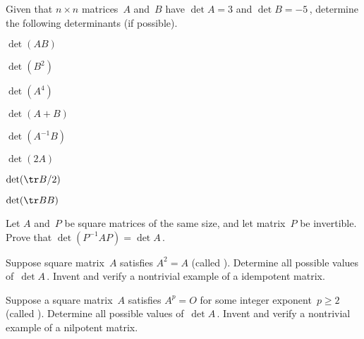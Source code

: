 \begin{exercise} \label{ex:} 
Given that \(n\times n\) matrices~\(A\) and~\(B\) have \(\det A=3\) and \(\det B=-5\)\,, determine the following determinants (if possible).
\begin{parts}
\item \(\det(AB)\)

\item \(\det(B^2)\)

\item \(\det(A^4)\)

\item \(\det(A+B)\)

\item \(\det(A^{-1}B)\)

\item \(\det(2A)\)

\item \(\det(\tr B/2)\)

\item \(\det(\tr BB)\)

\end{parts}
\end{exercise}






\begin{exercise} \label{ex:} 
Let \(A\) and~\(P\) be square matrices of the same size, and let matrix~\(P\) be invertible.  Prove that \(\det(P^{-1}AP)=\det A\)\,.
\end{exercise}





\begin{exercise} \label{ex:} 
Suppose square matrix~\(A\) satisfies \(A^2=A\) (called ).  Determine all possible values of~\(\det A\)\,.
Invent and verify a nontrivial example of a idempotent matrix.
\end{exercise}



\begin{exercise} \label{ex:} 
Suppose a square matrix~\(A\) satisfies \(A^p=O\) for some integer exponent~\(p\geq 2\) (called ). 
Determine all possible values of~\(\det A\)\,.
Invent and verify a nontrivial example of a nilpotent matrix. 
\end{exercise}






